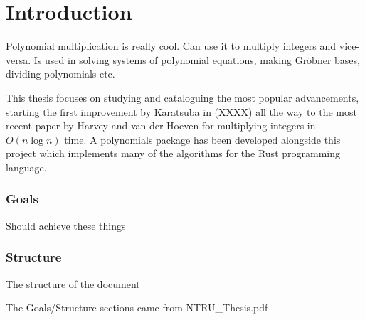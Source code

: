 \chapter{Introduction}\label{introduction}


Polynomial multiplication is really cool. Can use it to multiply integers and vice-versa. Is used in solving systems of polynomial equations, making Gr\"{o}bner bases, dividing polynomials etc.

This thesis focuses on studying and cataloguing the most popular advancements, starting the first improvement by Karatsuba in (XXXX) all the way to the most recent paper by Harvey and van der Hoeven for multiplying integers in $O(n\log n)$ time. A polynomials package has been developed alongside this project which implements many of the algorithms for the Rust programming language.

\subsection{Goals}%
\label{sub:goals}

Should achieve these things


\subsection{Structure}%
\label{sub:Structure}

The structure of the document

The Goals/Structure sections came from NTRU\_Thesis.pdf
